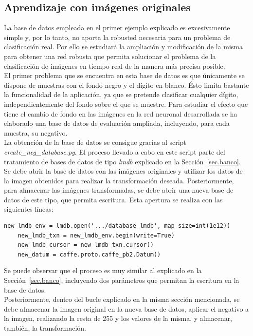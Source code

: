 \subsection{Aprendizaje con imágenes originales}
La base de datos empleada en el primer ejemplo explicado es excesivamente simple y, por lo tanto, no aporta la robusted necesaria para un problema de clasificación real. Por ello se estudiará la ampliación y modificación de la misma para obtener una red robusta que permita solucionar el problema de la clasificación de imágenes en tiempo real de la manera más precisa posible.\\

El primer problema que se encuentra en esta base de datos es que únicamente se dispone de muestras con el fondo negro y el dígito en blanco. Ésto limita bastante la funcionalidad de la aplicación, ya que se pretende clasificar cualquier dígito, independientemente del fondo sobre el que se muestre. Para estudiar el efecto que tiene el cambio de fondo en las imágenes en la red neuronal desarrollada se ha elaborado una base de datos de evaluación ampliada, incluyendo, para cada muestra, su negativo.\\

La obtención de la base de datos se consigue gracias al script \textit{create\_neg\_database.py}. El proceso llevado a cabo en este script parte del tratamiento de bases de datos de tipo \textit{lmdb} explicado en la Sección~\ref{sec.banco}. Se debe abrir la base de datos con las imágenes originales y utilizar los datos de la imagen obtenidos para realizar la transformación deseada. Posteriormente, para almacenar las imágenes transformadas, se debe abrir una nueva base de datos de este tipo, que permita escritura. Esta apertura se realiza con las siguientes líneas:
\vspace{10pt}
\begin{lstlisting}[frame=single]
	new_lmdb_env = lmdb.open('.../database_lmdb', map_size=int(1e12))
	new_lmdb_txn = new_lmdb_env.begin(write=True)
	new_lmdb_cursor = new_lmdb_txn.cursor()
	new_datum = caffe.proto.caffe_pb2.Datum()
	\end{lstlisting}

Se puede observar que el proceso es muy similar al explicado en la Sección~\ref{sec.banco}, incluyendo dos parámetros que permitan la escritura en la base de datos.\\

Posteriormente, dentro del bucle explicado en la misma sección mencionada, se debe almacenar la imagen original en la nueva base de datos, aplicar el negativo a la imagen, realizando la resta de 255 y los valores de la misma, y almacenar, también, la transformación.\\

